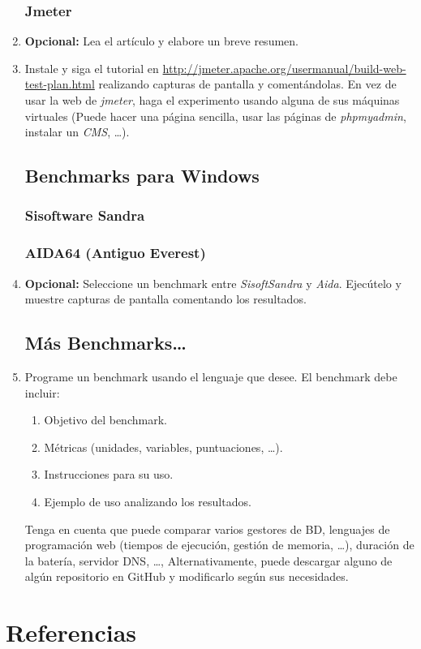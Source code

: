 \documentclass[paper=a4, fontsize=11pt]{scrartcl} %
\numberwithin{equation}{section} %
\numberwithin{figure}{section} %
\numberwithin{table}{section} %
\begin{document}
\begin{enumerate}
	\subsubsection{Jmeter}
		\item \textbf{Opcional:} Lea el artículo y elabore un breve resumen.
		
		\item Instale y siga el tutorial en \url{http://jmeter.apache.org/usermanual/build-web-test-plan.html}
		realizando capturas de pantalla y comentándolas. En vez de usar la web de \textit{jmeter},
		haga el experimento usando alguna de sus máquinas virtuales (Puede hacer una página sencilla,
		usar las páginas de \textit{phpmyadmin}, instalar un \textit{CMS}, \dots).
		
	\subsection{Benchmarks para Windows}
	\subsubsection{Sisoftware Sandra}
	\subsubsection{AIDA64 (Antiguo Everest)}
		\item \textbf{Opcional:} Seleccione un benchmark entre \textit{SisoftSandra} y \textit{Aida}.
		Ejecútelo y muestre capturas de pantalla comentando los resultados.
		
	\subsection{Más Benchmarks\dots}
		\item Programe un benchmark usando el lenguaje que desee. El benchmark debe incluir:
		\begin{enumerate}
			\item Objetivo del benchmark.
			\item Métricas (unidades, variables, puntuaciones, \dots).
			\item Instrucciones para su uso.
			\item Ejemplo de uso analizando los resultados.
		\end{enumerate}
		Tenga en cuenta que puede comparar varios gestores de BD, lenguajes de programación web (tiempos
		de ejecución, gestión de memoria, \dots), duración de la batería, servidor DNS, \dots,
		Alternativamente, puede descargar alguno de algún repositorio en GitHub y modificarlo según sus
		necesidades.
		
\end{enumerate}

\newpage
\section{Referencias}

\end{document}
